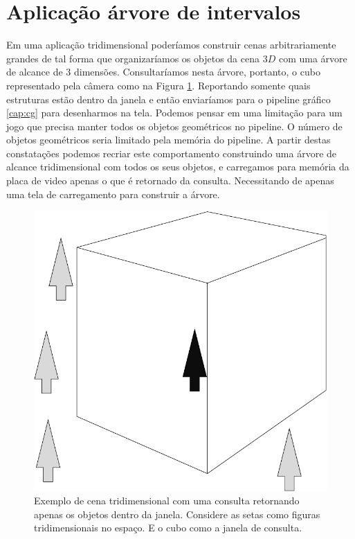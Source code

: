 \section{Aplicação árvore de intervalos}\label{cap:application-points}
Em uma aplicação tridimensional poderíamos construir cenas arbitrariamente grandes de tal forma que organizaríamos os objetos da cena $3D$ com uma árvore de alcance de 3 dimensões. Consultaríamos nesta árvore, portanto, o cubo representado pela câmera como na Figura \ref{fig:3d-query-example}. Reportando somente quais estruturas estão dentro da janela e então enviaríamos para o pipeline gráfico \ref{cap:cg} para desenharmos na tela. Podemos pensar em uma limitação para um jogo que precisa manter todos os objetos geométricos no pipeline. O número de objetos geométricos seria limitado pela memória do pipeline. 
A partir destas constatações podemos recriar este comportamento construindo uma árvore de alcance tridimensional com todos os seus objetos, e carregamos para memória da placa de video apenas o que é retornado da consulta. Necessitando de apenas uma tela de carregamento para construir a árvore.

\begin{figure}[h!]
    \centering
    \includegraphics[scale=0.4]{images/3d-query-example.pdf}
    \caption{Exemplo de cena tridimensional com uma consulta retornando apenas os objetos dentro da janela. Considere as setas como figuras tridimensionais no espaço. E o cubo como a janela de consulta.}
    \label{fig:3d-query-example}
\end{figure}

